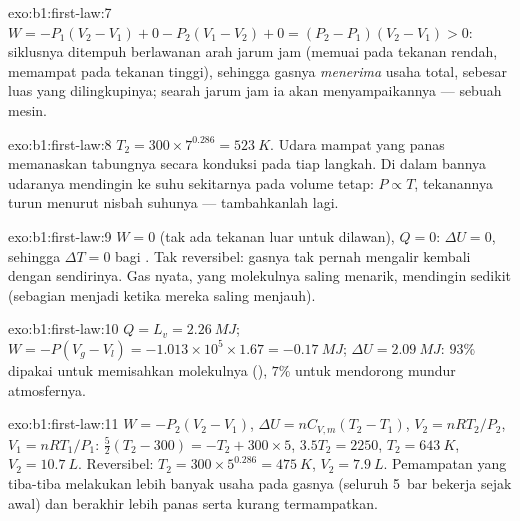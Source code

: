 \begin{solution}{exo:b1:first-law:7}
$W = -P_1(V_2 - V_1) + 0 - P_2(V_1 - V_2) + 0 = (P_2 - P_1)(V_2 - V_1) > 0$:
siklusnya ditempuh berlawanan arah jarum jam (memuai pada tekanan rendah,
memampat pada tekanan tinggi), sehingga gasnya \emph{menerima} usaha total, sebesar
luas yang dilingkupinya; searah jarum jam ia akan menyampaikannya --- sebuah mesin.
\end{solution}

\begin{solution}{exo:b1:first-law:8}
$T_2 = 300 \times 7^{0.286} = \qty{523}{K}$. Udara mampat yang panas memanaskan
tabungnya secara konduksi pada tiap langkah. Di dalam bannya udaranya mendingin ke
suhu sekitarnya pada volume tetap: $P \propto T$, tekanannya turun menurut nisbah
suhunya --- tambahkanlah lagi.
\end{solution}

\begin{solution}{exo:b1:first-law:9}
$W = 0$ (tak ada tekanan luar untuk dilawan), $Q = 0$: $\Delta U = 0$,
sehingga $\Delta T = 0$ bagi . Tak reversibel: gasnya tak pernah mengalir
kembali dengan sendirinya. Gas nyata, yang molekulnya saling menarik, mendingin sedikit
(sebagian  menjadi  ketika mereka saling menjauh).
\end{solution}

\begin{solution}{exo:b1:first-law:10}
$Q = L_v = \qty{2.26}{MJ}$; $W = -P(V_g - V_l) = -1.013\times10^5 \times 1.67 =
\qty{-0.17}{MJ}$; $\Delta U = \qty{2.09}{MJ}$: $93\%$  dipakai untuk
memisahkan molekulnya (), $7\%$ untuk mendorong mundur
atmosfernya.
\end{solution}

\begin{solution}{exo:b1:first-law:11}
$W = -P_2(V_2 - V_1)$, $\Delta U = nC_{V,m}(T_2 - T_1)$, $V_2 = nRT_2/P_2$, $V_1
= nRT_1/P_1$: $\tfrac52(T_2 - 300) = -T_2 + 300 \times 5$, $3.5T_2 = 2250$,
$T_2 = \qty{643}{K}$, $V_2 = \qty{10.7}{L}$. Reversibel: $T_2 = 300 \times
5^{0.286} = \qty{475}{K}$, $V_2 = \qty{7.9}{L}$. Pemampatan yang tiba-tiba melakukan
lebih banyak usaha pada gasnya (seluruh \qty{5}{bar} bekerja sejak awal) dan berakhir
lebih panas serta kurang termampatkan.
\end{solution}

